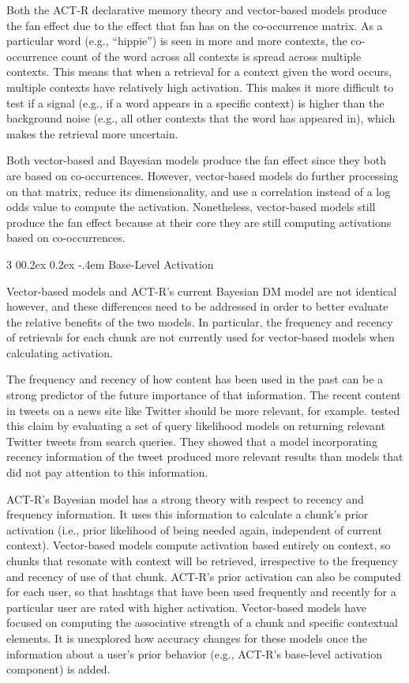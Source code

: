 \documentclass[man,floatsintext,donotrepeattitle]{apa6}
\makeatletter
\renewcommand{\subsubsection}{%
  \@startsection
  {subsubsection}%
  {3}%
  {\parindent}%
  {0\baselineskip \@plus 0.2ex \@minus 0.2ex}%
  {-.4em}%
  {\normalfont\normalsize\bfseries\addperi}}
\makeatother
\begin{document}
Both the ACT-R declarative memory theory and vector-based models produce the fan effect due to the effect that fan has on the co-occurrence matrix.
As a particular word (e.g., ``hippie'') is seen in more and more contexts, the co-occurrence count of the word across all contexts is spread across multiple contexts.
This means that when a retrieval for a context given the word occurs, multiple contexts have relatively high activation.
This makes it more difficult to test if a signal (e.g., if a word appears in a specific context) is higher than the background noise (e.g., all other contexts that the word has appeared in),
which makes the retrieval more uncertain.

Both vector-based and Bayesian models produce the fan effect since they both are based on co-occurrences.
However, vector-based models do further processing on that matrix, reduce its dimensionality, and use a correlation instead of a log odds value to compute the activation.
Nonetheless, vector-based models still produce the fan effect because at their core they are still computing activations based on co-occurrences.

\subsubsection{Base-Level Activation}

Vector-based models and ACT-R's current Bayesian DM model are not identical however, and these differences need to be addressed in order to better evaluate the relative benefits of the two models. 
In particular, the frequency and recency of retrievals for each chunk are not currently used for vector-based models when calculating activation.

The frequency and recency of how content has been used in the past can be a strong predictor of the future importance of that information. 
The recent content in tweets on a news site like Twitter should be more relevant, for example.
\textcite{Efron2011} tested this claim by evaluating a set of query likelihood models on returning relevant Twitter tweets from search queries.
They showed that a model incorporating recency information of the tweet produced more relevant results than models that did not pay attention to this information.

ACT-R's Bayesian model has a strong theory with respect to recency and frequency information.
It uses this information to calculate a chunk's prior activation (i.e., prior likelihood of being needed again, independent of current context).
Vector-based models compute activation based entirely on context, so chunks that resonate with context will be retrieved, irrespective to the frequency and recency of use of that chunk.
ACT-R's prior activation can also be computed for each user, so that hashtags that have been used frequently and recently for a particular user are rated with higher activation.
Vector-based models have focused on computing the associative strength of a chunk and specific contextual elements.
It is unexplored how accuracy changes for these models once the information about a user's prior behavior (e.g., ACT-R's base-level activation component) is added.
\end{document}
